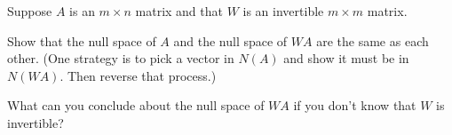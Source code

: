 \documentclass[minion]{homework}
\begin{document}
\begin{problems}
    \problem Suppose $A$ is an $m\times n$ matrix and 
    that $W$ is an invertible $m\times m$ matrix.
    	\begin{subproblems}
	\item Show that the null space of $A$ and the null space of $WA$
    are the same as each other.  (One strategy is to pick a vector in $N(A)$ and show it must be in $N(WA).$ Then reverse that process.)
    	\item What can you conclude
    about the null space of $WA$ 
    if you don't know that $W$ is invertible?
    	\end{subproblems}

\end{problems}
\end{document}
